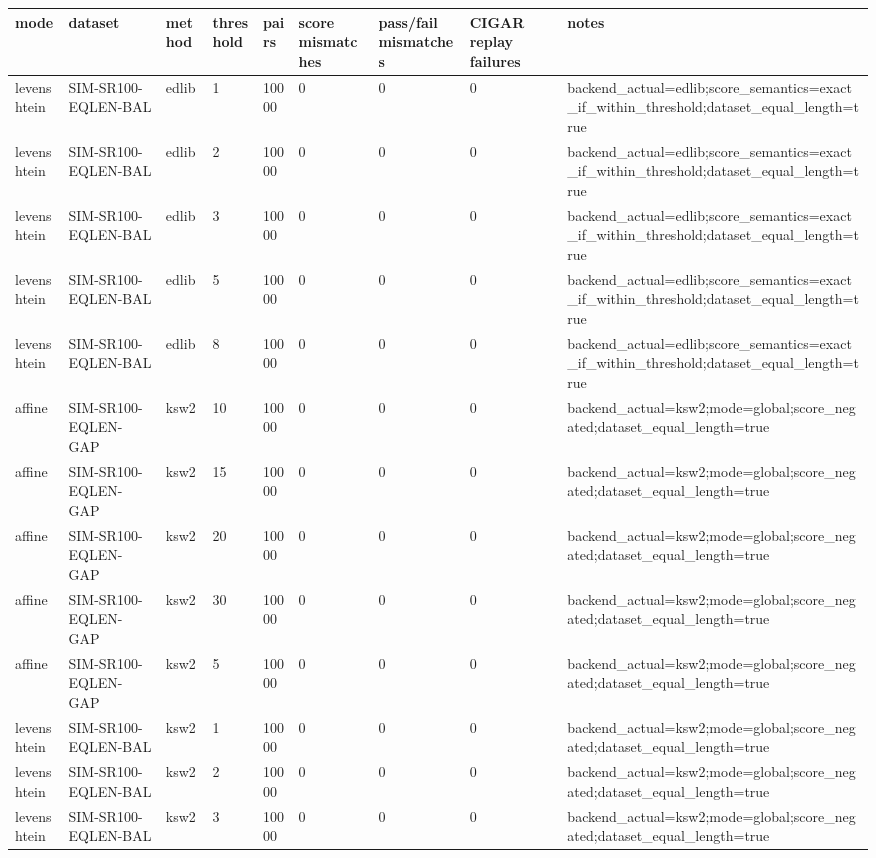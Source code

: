 \begin{tabular}{lllllllll}
\hline
mode & dataset & method & threshold & pairs & score mismatches & pass/fail mismatches & CIGAR replay failures & notes \\
\hline
levenshtein & SIM-SR100-EQLEN-BAL & edlib & 1 & 10000 & 0 & 0 & 0 & backend\_actual=edlib;score\_semantics=exact\_if\_within\_threshold;dataset\_equal\_length=true \\
levenshtein & SIM-SR100-EQLEN-BAL & edlib & 2 & 10000 & 0 & 0 & 0 & backend\_actual=edlib;score\_semantics=exact\_if\_within\_threshold;dataset\_equal\_length=true \\
levenshtein & SIM-SR100-EQLEN-BAL & edlib & 3 & 10000 & 0 & 0 & 0 & backend\_actual=edlib;score\_semantics=exact\_if\_within\_threshold;dataset\_equal\_length=true \\
levenshtein & SIM-SR100-EQLEN-BAL & edlib & 5 & 10000 & 0 & 0 & 0 & backend\_actual=edlib;score\_semantics=exact\_if\_within\_threshold;dataset\_equal\_length=true \\
levenshtein & SIM-SR100-EQLEN-BAL & edlib & 8 & 10000 & 0 & 0 & 0 & backend\_actual=edlib;score\_semantics=exact\_if\_within\_threshold;dataset\_equal\_length=true \\
affine & SIM-SR100-EQLEN-GAP & ksw2 & 10 & 10000 & 0 & 0 & 0 & backend\_actual=ksw2;mode=global;score\_negated;dataset\_equal\_length=true \\
affine & SIM-SR100-EQLEN-GAP & ksw2 & 15 & 10000 & 0 & 0 & 0 & backend\_actual=ksw2;mode=global;score\_negated;dataset\_equal\_length=true \\
affine & SIM-SR100-EQLEN-GAP & ksw2 & 20 & 10000 & 0 & 0 & 0 & backend\_actual=ksw2;mode=global;score\_negated;dataset\_equal\_length=true \\
affine & SIM-SR100-EQLEN-GAP & ksw2 & 30 & 10000 & 0 & 0 & 0 & backend\_actual=ksw2;mode=global;score\_negated;dataset\_equal\_length=true \\
affine & SIM-SR100-EQLEN-GAP & ksw2 & 5 & 10000 & 0 & 0 & 0 & backend\_actual=ksw2;mode=global;score\_negated;dataset\_equal\_length=true \\
levenshtein & SIM-SR100-EQLEN-BAL & ksw2 & 1 & 10000 & 0 & 0 & 0 & backend\_actual=ksw2;mode=global;score\_negated;dataset\_equal\_length=true \\
levenshtein & SIM-SR100-EQLEN-BAL & ksw2 & 2 & 10000 & 0 & 0 & 0 & backend\_actual=ksw2;mode=global;score\_negated;dataset\_equal\_length=true \\
levenshtein & SIM-SR100-EQLEN-BAL & ksw2 & 3 & 10000 & 0 & 0 & 0 & backend\_actual=ksw2;mode=global;score\_negated;dataset\_equal\_length=true \\

\end{tabular}
